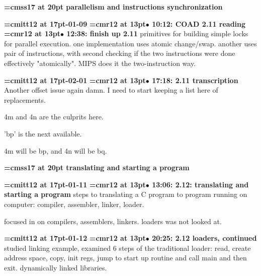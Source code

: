 {\medskip\noindent\bf\font\titlefont=cmss17 at 20pt parallelism and instructions synchronization}\medskip

{\medskip\noindent\bf\font\titlefont=cmitt12 at 17pt-01-09}\medskip
{\smallskip\noindent\bf\font\titlefont=cmr12 at 13pt\titlefont $\bullet$ 10:12: COAD 2.11 reading}\smallskip
{\smallskip\noindent\bf\font\titlefont=cmr12 at 13pt\titlefont $\bullet$ 12:38: finish up 2.11}\smallskip
primitives for building simple locks for parallel execution. one implementation uses atomic change/swap. another uses pair of instructions, with second checking if the two instructions were done effectively "atomically". MIPS does it the two-instruction way.
\par

{\medskip\noindent\bf\font\titlefont=cmitt12 at 17pt-02-01}\medskip
{\smallskip\noindent\bf\font\titlefont=cmr12 at 13pt\titlefont $\bullet$ 17:18: 2.11 transcription}\smallskip
Another offset issue again damn. I need to start keeping a list here of replacements.
\par

4m and 4n are the culprits here.
\par

'bp' is the next available.
\par

4m will be bp, and 4n will be bq.
\par

{\medskip\noindent\bf\font\titlefont=cmss17 at 20pt translating and starting a program}\medskip

{\medskip\noindent\bf\font\titlefont=cmitt12 at 17pt-01-11}\medskip
{\smallskip\noindent\bf\font\titlefont=cmr12 at 13pt\titlefont $\bullet$ 13:06: 2.12: translating and starting a program} steps to translating a C program to program running on computer: compiler, assembler, linker, loader.
\par

focused in on compilers, assemblers, linkers. loaders was not looked at.
\par

{\medskip\noindent\bf\font\titlefont=cmitt12 at 17pt-01-12}\medskip
{\smallskip\noindent\bf\font\titlefont=cmr12 at 13pt\titlefont $\bullet$ 20:25: 2.12 loaders, continued}\smallskip
studied linking example, examined 6 steps of the traditional loader: read, create address space, copy, init regs, jump to start up routine and call main and then exit. dynamically linked libraries.
\par

